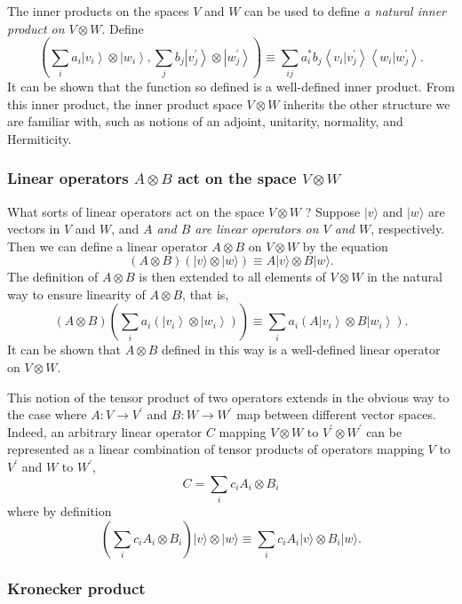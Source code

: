 The inner products on the spaces $V$ and $W$ can be used to define \textit{a natural inner product on $V \otimes W$}. Define
$$
\left(\sum_{i} a_{i}\left|v_{i}\right\rangle \otimes\left|w_{i}\right\rangle, \sum_{j} b_{j}\left|v_{j}^{\prime}\right\rangle \otimes\left|w_{j}^{\prime}\right\rangle\right) \equiv \sum_{i j} a_{i}^{*} b_{j}\left\langle v_{i} | v_{j}^{\prime}\right\rangle\left\langle w_{i} | w_{j}^{\prime}\right\rangle.
$$
It can be shown that the function so defined is a well-defined inner product. From this inner product, the inner product space $V \otimes W$ inherits the other structure we are familiar with, such as notions of an adjoint, unitarity, normality, and Hermiticity.

\subsubsection{Linear operators $A \otimes B$ act on the space $V \otimes W$}

What sorts of linear operators act on the space $V \otimes W$ ? Suppose $|v\rangle$ and $|w\rangle$ are vectors in $V$ and $W$, and \textit{$A$ and $B$ are linear operators on $V$ and $W$}, respectively. Then we can define a linear operator $A \otimes B$ on $V \otimes W$ by the equation
$$
(A \otimes B)(|v\rangle \otimes|w\rangle) \equiv A|v\rangle \otimes B|w\rangle.
$$
The definition of $A \otimes B$ is then extended to all elements of $V \otimes W$ in the natural way to ensure linearity of $A \otimes B$, that is,
$$
(A \otimes B)\left(\sum_{i} a_{i} \left(\left|v_{i}\right\rangle \otimes\left|w_{i}\right\rangle\right) \right)  \equiv \sum_{i} a_{i} \left( A\left|v_{i}\right\rangle \otimes B\left|w_{i}\right\rangle \right) .
$$
It can be shown that $A \otimes B$ defined in this way is a well-defined linear operator on $V \otimes W$. 

This notion of the tensor product of two operators extends in the obvious way to the case where $A: V \rightarrow V^{\prime}$ and $B: W \rightarrow W^{\prime}$ map between different vector spaces. Indeed, an arbitrary linear operator $C$ mapping $V \otimes W$ to $V^{\prime} \otimes W^{\prime}$ can be represented as a linear combination of tensor products of operators mapping $V$ to $V^{\prime}$ and $W$ to $W^{\prime}$,
$$
C=\sum_{i} c_{i} A_{i} \otimes B_{i}
$$
where by definition
$$
\left(\sum_{i} c_{i} A_{i} \otimes B_{i}\right)|v\rangle \otimes|w\rangle \equiv \sum_{i} c_{i} A_{i}|v\rangle \otimes B_{i}|w\rangle .
$$

\subsubsection{Kronecker product}

